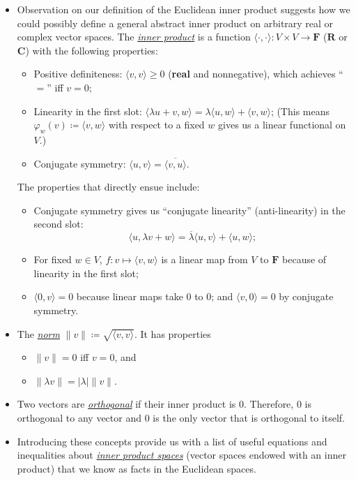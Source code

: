 \documentclass{article}
\newcommand{\df}[1]{\ul{\textit{#1}}}
\newcommand{\R}{\mathbf{R}}
\newcommand{\C}{\mathbf{C}}
\newcommand{\F}{\mathbf{F}}
\newcommand{\conj}[1]{\overline{#1}}
\newcommand{\inp}[2]{\langle #1, #2 \rangle}
\renewcommand{\phi}{\varphi}
\begin{document}
\begin{itemize}
    \item Observation on our definition of the Euclidean inner product suggests how we could possibly define a general abstract inner product on arbitrary real or complex vector spaces. The \df{inner product} is a function $\inp{\cdot}{\cdot}: V \times V \to \F$ ($\R$ or $\C$) with the following properties:
    \begin{itemize}
        \item Positive definiteness: $\inp{v}{v} \geq 0$ (\textbf{real} and nonnegative), which achieves ``$=$'' iff $v = 0$;
        \item Linearity in the first slot: $\inp{\lambda u+v}{w} = \lambda \inp{u}{w} + \inp{v}{w}$; (This means $\phi_w(v) \coloneqq \inp{v}{w}$ with respect to a fixed $w$ gives us a linear functional on $V$.)
        \item Conjugate symmetry: $\inp{u}{v} = \conj{\inp{v}{u}}$.
    \end{itemize}
    The properties that directly ensue include:
    \begin{itemize}
        \item Conjugate symmetry gives us ``conjugate linearity'' (anti-linearity) in the second slot: $$\inp{u}{\lambda v+w} = \conj{\lambda} \inp{u}{v} + \inp{u}{w};$$
        \item For fixed $w \in V$, $f: v \mapsto \inp{v}{w}$ is a linear map from $V$ to $\F$ because of linearity in the first slot;
        \item $\inp{0}{v} = 0$ because linear maps take 0 to 0; and $\inp{v}{0} = 0$ by conjugate symmetry.
    \end{itemize}
    \item The \df{norm} $\|v\| \coloneqq \sqrt{\inp{v}{v}}.$ It has properties
    \begin{itemize}
        \item $\|v\| = 0$ iff $v = 0$, and 
        \item $\|\lambda v\| = |\lambda| \|v\|$.
    \end{itemize}
    \item Two vectors are \df{orthogonal} if their inner product is 0. Therefore, 0 is orthogonal to any vector and 0 is the only vector that is orthogonal to itself.
    \item Introducing these concepts provide us with a list of useful equations and inequalities about \df{inner product spaces} (vector spaces endowed with an inner product) that we know as facts in the Euclidean spaces.
    \begin{itemize}

\end{itemize}
\end{itemize}
\end{document}
